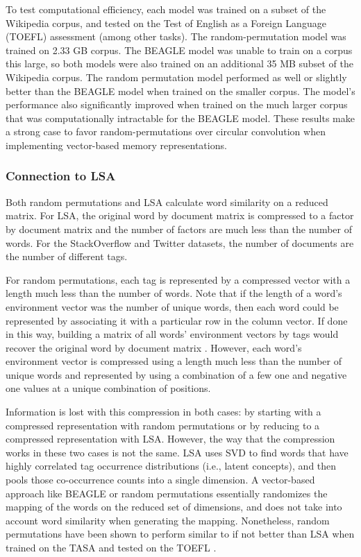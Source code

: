 \documentclass[man,floatsintext,donotrepeattitle]{apa6}
\begin{document}
To test computational efficiency, each model was trained on a subset of the Wikipedia corpus, and tested on the Test of English as a Foreign Language (TOEFL) assessment (among other tasks).
The random-permutation model was trained on \num{2.33} GB corpus.
The BEAGLE model was unable to train on a corpus this large, so both models were also trained on an additional \num{35} MB subset of the Wikipedia corpus.
The random permutation model performed as well or slightly better than the BEAGLE model when trained on the smaller corpus.
The model's performance also significantly improved when trained on the much larger corpus that was computationally intractable for the BEAGLE model.
These results make a strong case to favor random-permutations over circular convolution when implementing vector-based memory representations.

\subsubsection{Connection to LSA}

Both random permutations and LSA calculate word similarity on a reduced matrix.
For LSA, the original word by document matrix is compressed to a factor by document matrix and the number of factors are much less than the number of words.
For the StackOverflow and Twitter datasets, the number of documents are the number of different tags.

For random permutations, each tag is represented by a compressed vector with a length much less than the number of words.
Note that if the length of a word's environment vector was the number of unique words, then each word could be represented by associating it with a particular row in the column vector.
If done in this way, building a matrix of all words' environment vectors by tags would recover the original word by document matrix \parencite{Kanerva2000}.
However, each word's environment vector is compressed using a length much less than the number of unique words and represented by using a combination of a few one and negative one values at a unique combination of positions. 

Information is lost with this compression in both cases: by starting with a compressed representation with random permutations or by reducing to a compressed representation with LSA.
However, the way that the compression works in these two cases is not the same.
LSA uses SVD to find words that have highly correlated tag occurrence distributions (i.e., latent concepts), and then pools those co-occurrence counts into a single dimension.
A vector-based approach like BEAGLE or random permutations essentially randomizes the mapping of the words on the reduced set of dimensions, and does not take into account word similarity when generating the mapping.
Nonetheless, random permutations have been shown to perform similar to if not better than LSA when trained on the TASA and tested on the TOEFL \parencites{Sahlgren2008,Jones2007}.
\end{document}
